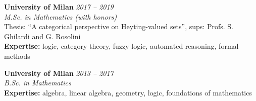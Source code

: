 \documentclass[a4paper,10pt]{article}
\begin{document}
\textbf{University of Milan} \hfill \textit{2017 -- 2019} \\
\textit{M.Sc. in Mathematics (with honors)} \\
Thesis: ``A categorical perspective on Heyting-valued sets'', sups: Profs. S. Ghilardi and G. Rosolini \\
\textbf{Expertise:} logic, category theory, fuzzy logic, automated reasoning, formal methods

\textbf{University of Milan} \hfill \textit{2013 -- 2017} \\
\textit{B.Sc. in Mathematics} \\
\textbf{Expertise:} algebra, linear algebra, geometry, logic, foundations of mathematics



%
%
%
%
\end{document}
